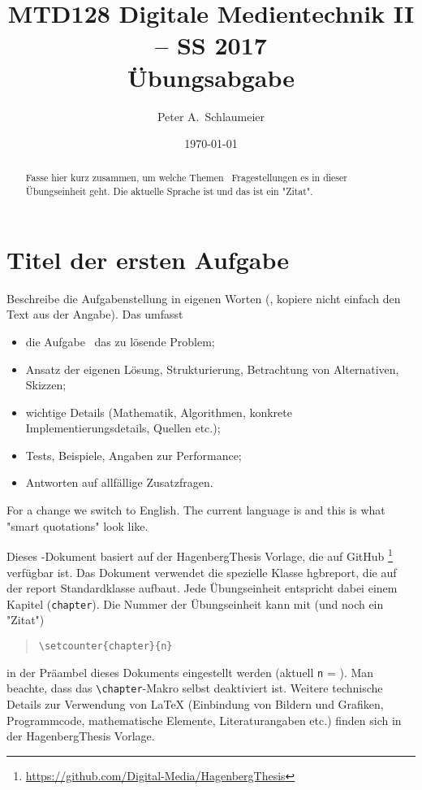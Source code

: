 \documentclass[german,notitlepage,smartquotes]{hgbreport}
\author{Peter A.\ Schlaumeier}
\title{MTD128 Digitale Medientechnik II -- SS 2017\\
				Übungsabgabe \arabic{chapter}}
\date{\today}
\renewcommand{\chapter}[1]{}		%
\begin{document}
\maketitle

\begin{abstract}\noindent
Fasse hier kurz zusammen, um welche Themen \bzw\ Fragestellungen 
es in dieser Übungseinheit geht. 
Die aktuelle Sprache ist \texttt{\languagename} und das ist ein "Zitat".
\end{abstract}


\section{Titel der ersten Aufgabe}

Beschreibe die Aufgabenstellung in eigenen Worten 
(\dah, kopiere nicht einfach den Text aus der Angabe).
Das umfasst \ia 
\begin{itemize}
\item
	die Aufgabe \bzw\ das zu lösende Problem;
\item
	Ansatz der eigenen Lösung, Strukturierung, Betrachtung von Alternativen, Skizzen;
\item
	wichtige Details (Mathematik, Algorithmen, konkrete Implementierungsdetails,
	Quellen \cite{Sedgewick2011} %
	etc.);
\item
	Tests, Beispiele, Angaben zur Performance;
\item
	Antworten auf allfällige Zusatzfragen.
\end{itemize}
%
\begin{english}
For a change we switch to English. 
The current language is \texttt{\languagename}
and this is what "smart quotations" look like.
\end{english}
Dieses \latex-Dokument basiert auf der \textsf{HagenbergThesis} 
Vorlage, die auf GitHub%
\footnote{\url{https://github.com/Digital-Media/HagenbergThesis}}
verfügbar ist.
Das Dokument verwendet die spezielle Klasse \textsf{hgbreport}, die auf der \textsf{report}
Standardklasse aufbaut. Jede Übungseinheit entspricht dabei einem Kapitel (\texttt{chapter}).
Die Nummer der Übungseinheit kann mit (und noch ein "Zitat") %
\begin{quote}
\verb!\setcounter{chapter}{n}!
\end{quote}
in der Präambel dieses Dokuments eingestellt werden (aktuell \texttt{n} = ).
Man beachte, dass das \verb!\chapter!-Makro selbst deaktiviert ist.
Weitere technische Details zur Verwendung von LaTeX (Einbindung von Bildern und Grafiken,
Programmcode, mathematische Elemente, 
Literaturangaben etc.) finden sich in der \textsf{HagenbergThesis} Vorlage.
\end{document}
